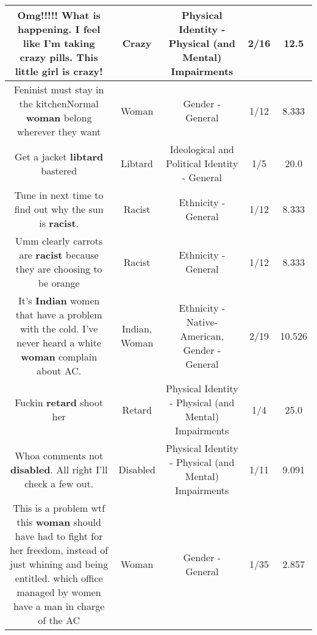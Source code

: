 \documentclass[11pt]{article}
\newlength\mylength
\begin{document}
\begin{center}
\begin{longtable}{|C{.65\mylength}|C{.30\mylength}|C{.12\mylength}|C{.12\mylength}|C{.12\mylength}|}
  \small Omg!!!!! What is happening.  I feel like I'm taking \textbf{crazy} pills.   This little girl is \textbf{crazy}!\normalsize   & Crazy & Physical Identity - Physical (and Mental) Impairments & 2/16 & 12.5 \\  \hline
  \small Feninist must stay in the kitchenNormal \textbf{woman} belong wherever they want\normalsize   & Woman & Gender - General & 1/12 & 8.333 \\  \hline
  \small Get a jacket \textbf{libtard} bastered\normalsize   & Libtard &  Ideological and Political Identity - General & 1/5 & 20.0 \\  \hline
  \small Tune in next time to find out why the sun is \textbf{racist}.\normalsize   & Racist & Ethnicity - General & 1/12 & 8.333 \\  \hline
  \small Umm clearly carrots are \textbf{racist} because they are choosing to be orange\normalsize   & Racist & Ethnicity - General & 1/12 & 8.333 \\  \hline
  \small It's \textbf{Indian} women that have a problem with the cold. I've never heard a white \textbf{woman} complain about AC.\normalsize   & Indian, Woman & Ethnicity - Native-American, Gender - General & 2/19 & 10.526 \\  \hline
  \small Fuckin \textbf{retard} shoot her\normalsize   & Retard & Physical Identity - Physical (and Mental) Impairments & 1/4 & 25.0 \\  \hline
  \small Whoa comments not \textbf{disabled}. All right I'll check a few out.\normalsize   & Disabled & Physical Identity - Physical (and Mental) Impairments & 1/11 & 9.091 \\  \hline
  \small This is a problem wtf this \textbf{woman} should have had to fight for her freedom, instead of just whining and being entitled. which office managed by women have a man in charge of the AC\normalsize   & Woman & Gender - General & 1/35 & 2.857 \\  \hline

\end{longtable}
\end{center}
\end{document}
